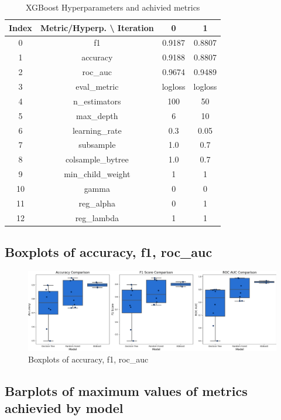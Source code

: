 \documentclass{article}%
\begin{document}
%


\begin{table}[h!]%
\caption{XGBoost Hyperparameters and achivied metrics}%
\vspace{0.2cm}%
\centering%
\begin{tabular}{|c||c||c||c|}%
\hline%
Index&Metric/Hyperp. \textbackslash{} Iteration&0&1\\%
\hline%
0&f1&0.9187&0.8807\\%
1&accuracy&0.9188&0.8807\\%
2&roc\_auc&0.9674&0.9489\\%
3&eval\_metric&logloss&logloss\\%
4&n\_estimators&100&50\\%
5&max\_depth&6&10\\%
6&learning\_rate&0.3&0.05\\%
7&subsample&1.0&0.7\\%
8&colsample\_bytree&1.0&0.7\\%
9&min\_child\_weight&1&1\\%
10&gamma&0&0\\%
11&reg\_alpha&0&1\\%
12&reg\_lambda&1&1\\%
\hline%
\end{tabular}%
\end{table}

%
\newpage%
\subsection{Boxplots of accuracy, f1, roc\_auc}%
\label{subsec:Boxplotsofaccuracy,f1,rocauc}%


\begin{figure}[h!]%
\centering%
\includegraphics[width=460px]{ModelOptimization/box_plots_metrics.png}%
\caption{Boxplots of accuracy, f1, roc\_auc}%
\end{figure}

%
\subsection{Barplots of maximum values of metrics achievied by model}%
\label{subsec:Barplotsofmaximumvaluesofmetricsachieviedbymodel}%
\end{document}
